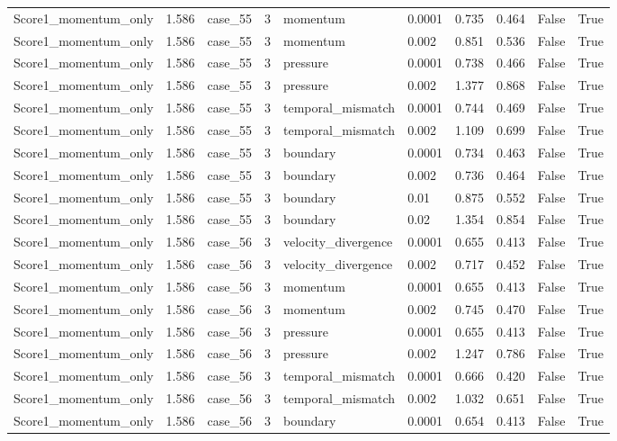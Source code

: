 \begin{longtable}{llllllllll}
Score1\_momentum\_only & 1.586 & case\_55 & 3 & momentum & 0.0001 & 0.735 & 0.464 & False & True \\
Score1\_momentum\_only & 1.586 & case\_55 & 3 & momentum & 0.002 & 0.851 & 0.536 & False & True \\
Score1\_momentum\_only & 1.586 & case\_55 & 3 & pressure & 0.0001 & 0.738 & 0.466 & False & True \\
Score1\_momentum\_only & 1.586 & case\_55 & 3 & pressure & 0.002 & 1.377 & 0.868 & False & True \\
Score1\_momentum\_only & 1.586 & case\_55 & 3 & temporal\_mismatch & 0.0001 & 0.744 & 0.469 & False & True \\
Score1\_momentum\_only & 1.586 & case\_55 & 3 & temporal\_mismatch & 0.002 & 1.109 & 0.699 & False & True \\
Score1\_momentum\_only & 1.586 & case\_55 & 3 & boundary & 0.0001 & 0.734 & 0.463 & False & True \\
Score1\_momentum\_only & 1.586 & case\_55 & 3 & boundary & 0.002 & 0.736 & 0.464 & False & True \\
Score1\_momentum\_only & 1.586 & case\_55 & 3 & boundary & 0.01 & 0.875 & 0.552 & False & True \\
Score1\_momentum\_only & 1.586 & case\_55 & 3 & boundary & 0.02 & 1.354 & 0.854 & False & True \\
Score1\_momentum\_only & 1.586 & case\_56 & 3 & velocity\_divergence & 0.0001 & 0.655 & 0.413 & False & True \\
Score1\_momentum\_only & 1.586 & case\_56 & 3 & velocity\_divergence & 0.002 & 0.717 & 0.452 & False & True \\
Score1\_momentum\_only & 1.586 & case\_56 & 3 & momentum & 0.0001 & 0.655 & 0.413 & False & True \\
Score1\_momentum\_only & 1.586 & case\_56 & 3 & momentum & 0.002 & 0.745 & 0.470 & False & True \\
Score1\_momentum\_only & 1.586 & case\_56 & 3 & pressure & 0.0001 & 0.655 & 0.413 & False & True \\
Score1\_momentum\_only & 1.586 & case\_56 & 3 & pressure & 0.002 & 1.247 & 0.786 & False & True \\
Score1\_momentum\_only & 1.586 & case\_56 & 3 & temporal\_mismatch & 0.0001 & 0.666 & 0.420 & False & True \\
Score1\_momentum\_only & 1.586 & case\_56 & 3 & temporal\_mismatch & 0.002 & 1.032 & 0.651 & False & True \\
Score1\_momentum\_only & 1.586 & case\_56 & 3 & boundary & 0.0001 & 0.654 & 0.413 & False & True \\

\end{longtable}
